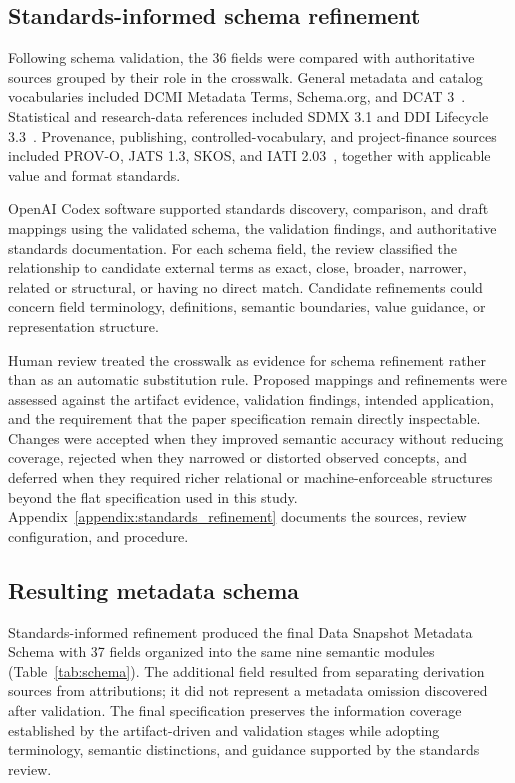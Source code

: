 \documentclass{article}
\begin{document}
\subsection{Standards-informed schema refinement}
\label{sec:standards_refinement_case_study}

Following schema validation, the 36 fields were compared with authoritative sources grouped by their role in the crosswalk. General metadata and catalog vocabularies included DCMI Metadata Terms, Schema.org, and DCAT 3~\citep{dcmi2020terms,schemaorg2026,albertoni2024dcat3}. Statistical and research-data references included SDMX 3.1 and DDI Lifecycle 3.3~\citep{sdmx2025standards,ddi2020lifecycle33}. Provenance, publishing, controlled-vocabulary, and project-finance sources included PROV-O, JATS 1.3, SKOS, and IATI 2.03~\citep{lebo2013provo,niso2021jats13,miles2009skos,iati203}, together with applicable value and format standards.

OpenAI Codex software supported standards discovery, comparison, and draft mappings using the validated schema, the validation findings, and authoritative standards documentation. For each schema field, the review classified the relationship to candidate external terms as exact, close, broader, narrower, related or structural, or having no direct match. Candidate refinements could concern field terminology, definitions, semantic boundaries, value guidance, or representation structure.

Human review treated the crosswalk as evidence for schema refinement rather than as an automatic substitution rule. Proposed mappings and refinements were assessed against the artifact evidence, validation findings, intended application, and the requirement that the paper specification remain directly inspectable. Changes were accepted when they improved semantic accuracy without reducing coverage, rejected when they narrowed or distorted observed concepts, and deferred when they required richer relational or machine-enforceable structures beyond the flat specification used in this study. Appendix~\ref{appendix:standards_refinement} documents the sources, review configuration, and procedure.

\subsection{Resulting metadata schema}

Standards-informed refinement produced the final Data Snapshot Metadata Schema with 37 fields organized into the same nine semantic modules (Table~\ref{tab:schema}). The additional field resulted from separating derivation sources from attributions; it did not represent a metadata omission discovered after validation. The final specification preserves the information coverage established by the artifact-driven and validation stages while adopting terminology, semantic distinctions, and guidance supported by the standards review.
\end{document}

